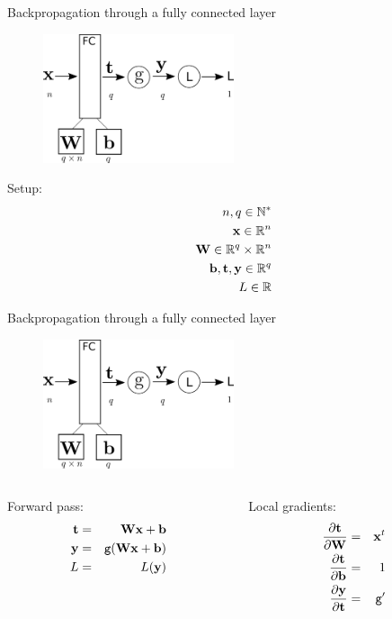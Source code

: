 \documentclass[xcolor=pdftex,dvipsnames,table,mathserif]{beamer}
\begin{document}
\begin{frame}{Backpropagation through a fully connected layer}
\begin{figure}
\includegraphics[width=0.5\textwidth]{../graphics/bp_fc.png}
\end{figure}

Setup:
\begin{eqnarray*}
n, q \in \mathbb{N}^*\\
\mathbf{x} \in \mathbb{R}^n \\
\mathbf{W} \in \mathbb{R}^q \times \mathbb{R}^n \\
\mathbf{b}, \mathbf{t}, \mathbf{y} \in \mathbb{R}^q \\
L \in \mathbb{R}
\end{eqnarray*}

\end{frame}

\begin{frame}{Backpropagation through a fully connected layer}
\begin{figure}
\includegraphics[width=0.5\textwidth]{../graphics/bp_fc.png}
\end{figure}

\begin{columns}
  \begin{column}{0.5\textwidth}
    Forward pass:
    \begin{eqnarray*}
      \mathbf{t} &=& \mathbf{W}\mathbf{x} + \mathbf{b} \\
      \mathbf{y} &=& \texttt{g}(\mathbf{W}\mathbf{x} + \mathbf{b}) \\
      L &=& L(\mathbf{y})
    \end{eqnarray*}
  \end{column}

  \begin{column}{0.5\textwidth}
    Local gradients:
    \begin{eqnarray*}
      \pdv{\mathbf{t}}{\mathbf{W}} &=& \mathbf{x}^t \\
      \pdv{\mathbf{t}}{\mathbf{b}} &=& 1 \\
      \pdv{\mathbf{y}}{\mathbf{t}} &=& \texttt{g}'
    \end{eqnarray*}
  \end{column}
\end{columns}

\end{frame}
\end{document}

